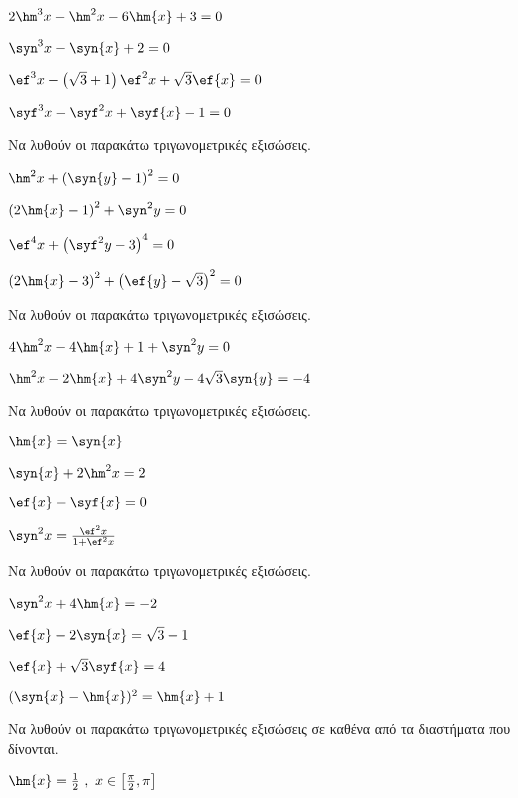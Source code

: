 \begin{multicols}{2}
\begin{rlist}
\item $ 2\hm^3{x}-\hm^2{x}-6\hm{x}+3=0 $
\item $ \syn^3{x}-\syn{x}+2=0 $
\item $ \ef^3{x}-\left( \sqrt{3}+1\right) \ef^2{x}+\sqrt{3}\ef{x}=0 $
\item $ \syf^3{x}-\syf^2{x}+\syf{x}-1=0 $
\end{rlist}
\Askhsh Να λυθούν οι παρακάτω τριγωνομετρικές εξισώσεις.
\begin{rlist}
\item $ \hm^2{x}+\left(\syn{y}-1\right)^2=0 $
\item $ \left(2\hm{x}-1\right)^2+\syn^2{y}=0 $
\item $ \ef^4{x}+\left(\syf^2{y}-3\right)^4=0 $
\item $ \left(2\hm{x}-3\right)^2+\left( \ef{y}-\sqrt{3}\right)^2=0 $
\end{rlist}
\Askhsh Να λυθούν οι παρακάτω τριγωνομετρικές εξισώσεις.
\begin{rlist}[leftmargin=4mm]
\item $ 4\hm^2{x}-4\hm{x}+1+\syn^2{y}=0 $
\item $ \hm^2{x}-2\hm{x}+4\syn^2{y}-4\sqrt{3}\syn{y}=-4 $
\end{rlist}
\Askhsh
Να λυθούν οι παρακάτω τριγωνομετρικές εξισώσεις.
\begin{rlist}
\item $ \hm{x}=\syn{x} $
\item $ \syn{x}+2\hm^2{x}=2 $
\item $ \ef{x}-\syf{x}=0 $
\item $ \syn^2{x}=\frac{\ef^2{x}}{1+\ef^2{x}} $
\end{rlist}
\Askhsh
Να λυθούν οι παρακάτω τριγωνομετρικές εξισώσεις.
\begin{rlist}
\item $ \syn^2{x}+4\hm{x}=-2 $
\item $ \ef{x}-2\syn{x}=\sqrt{3}-1 $
\item $ \ef{x}+\sqrt{3}\syf{x}=4 $
\item $ (\syn{x}-\hm{x})^2=\hm{x}+1 $
\end{rlist}
\Askhsh 
Να λυθούν οι παρακάτω τριγωνομετρικές εξισώσεις σε καθένα από τα διαστήματα που δίνονται.
\begin{rlist}
\item $ \hm{x}=\frac{1}{2}\ ,\ x\in\left[\frac{\pi}{2},\pi\right]  $

\end{rlist}
\end{multicols}
